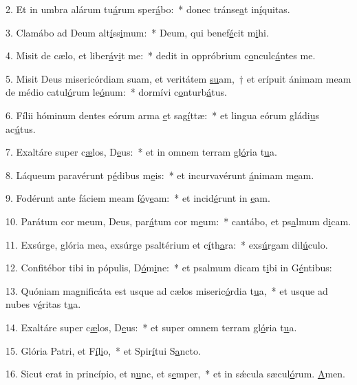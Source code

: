 2. Et in umbra alárum tu\uline{á}rum sper\uline{á}bo:~* donec tránse\uline{a}t in\uline{í}quitas.\par 
3. Clamábo ad Deum alt\uline{í}ss\uline{i}mum:~* Deum, qui benef\uline{é}cit m\uline{i}hi.\par 
4. Misit de cælo, et liber\uline{á}v\uline{i}t me:~* dedit in oppróbrium c\uline{o}nculc\uline{á}ntes me.\par 
5. Misit Deus misericórdiam suam, et veritátem \uline{su}am,~† et erípuit ánimam meam de médio catul\uline{ó}rum le\uline{ó}num:~* dormívi c\uline{o}nturb\uline{á}tus.\par 
6. Fílii hóminum dentes eórum arma \uline{e}t sag\uline{í}ttæ:~* et lingua eórum gládi\uline{u}s ac\uline{ú}tus.\par 
7. Exaltáre super c\uline{æ}los, D\uline{e}us:~* et in omnem terram gl\uline{ó}ria t\uline{u}a.\par 
8. Láqueum paravérunt p\uline{é}dibus m\uline{e}is:~* et incurvavérunt \uline{á}nimam m\uline{e}am.\par 
9. Fodérunt ante fáciem meam f\uline{ó}v\uline{e}am:~* et incid\uline{é}runt in \uline{e}am.\par 
10. Parátum cor meum, Deus, par\uline{á}tum cor m\uline{e}um:~* cantábo, et ps\uline{a}lmum d\uline{i}cam.\par 
11. Exsúrge, glória mea, exsúrge psaltérium et c\uline{í}th\uline{a}ra:~* exs\uline{ú}rgam dil\uline{ú}culo.\par 
12. Confitébor tibi in pópulis, D\uline{ó}m\uline{i}ne:~* et psalmum dicam t\uline{i}bi in G\uline{é}ntibus:\par 
13. Quóniam magnificáta est usque ad cælos miseric\uline{ó}rdia t\uline{u}a,~* et usque ad nubes v\uline{é}ritas t\uline{u}a.\par 
14. Exaltáre super c\uline{æ}los, D\uline{e}us:~* et super omnem terram gl\uline{ó}ria t\uline{u}a.\par 
15. Glória Patri, et F\uline{í}l\uline{i}o,~* et Spir\uline{í}tui S\uline{a}ncto.\par 
16. Sicut erat in princípio, et n\uline{u}nc, et s\uline{e}mper,~* et in sǽcula sæcul\uline{ó}rum. \uline{A}men.\par 
